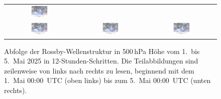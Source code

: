 \begin{figure}
\begin{tabular}{ccc}
		\includegraphics[width=0.32\textwidth, trim=3.1cm 3cm 3.0cm 0.8cm, clip]{papers/rossby/images/data_2025_5_3_12_00_500.pdf}   \\
		\includegraphics[width=0.32\textwidth, trim=3.1cm 3cm 3.0cm 0.8cm, clip]{papers/rossby/images/data_2025_5_4_00_00_500.pdf} &
		\includegraphics[width=0.32\textwidth, trim=3.1cm 3cm 3.0cm 0.8cm, clip]{papers/rossby/images/data_2025_5_4_12_00_500.pdf} &
		\includegraphics[width=0.32\textwidth, trim=3.1cm 3cm 3.0cm 0.8cm, clip]{papers/rossby/images/data_2025_5_5_00_00_500.pdf}   \\
	\end{tabular}
	\caption{Abfolge der Rossby-Wellenstruktur in 500\,hPa Höhe vom 1.\ bis 5.\ Mai 2025 in 12-Stunden-Schritten.
		Die Teilabbildungen sind zeilenweise von links nach rechts zu lesen, beginnend mit dem 1.\ Mai 00:00~UTC (oben links)
		bis zum 5.\ Mai 00:00~UTC (unten rechts).}
	\label{fig:rossby_grid}
\end{figure}

